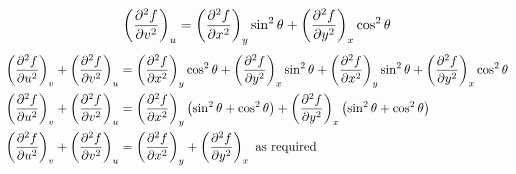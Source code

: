 \documentclass[10pt,\jkfside,a4paper]{article}
\begin{document}
\begin{enumerate}
\begin{equation}
\begin{split}
\left(\pdv[2]{f}{v}\right)_u &= \left(\pdv[2]{f}{x}\right)_y\sin^2\theta + \left(\pdv[2]{f}{y}\right)_x\cos^2\theta \\
\end{split}
\end{equation}
\begin{equation}
\begin{split}
\left(\pdv[2]{f}{u}\right)_v + \left(\pdv[2]{f}{v}\right)_u &= \left(\pdv[2]{f}{x}\right)_y\cos^2\theta + \left(\pdv[2]{f}{y}\right)_x\sin^2\theta + \left(\pdv[2]{f}{x}\right)_y\sin^2\theta + \left(\pdv[2]{f}{y}\right)_x\cos^2\theta \\
\left(\pdv[2]{f}{u}\right)_v + \left(\pdv[2]{f}{v}\right)_u &= \left(\pdv[2]{f}{x}\right)_y\left(\sin^2\theta + \cos^2\theta\right) + \left(\pdv[2]{f}{y}\right)_x\left(\sin^2\theta + \cos^2\theta\right) \\
\left(\pdv[2]{f}{u}\right)_v + \left(\pdv[2]{f}{v}\right)_u &= \left(\pdv[2]{f}{x}\right)_y + \left(\pdv[2]{f}{y}\right)_x \text{ as required}\\
\end{split}
\end{equation}

\end{enumerate}
\end{document}
